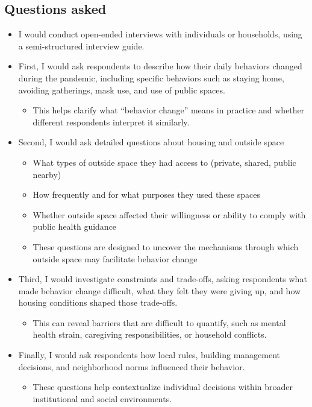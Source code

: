 \documentclass[
  letterpaper,
  DIV=11,
  numbers=noendperiod]{scrartcl}
\providecommand{\tightlist}{%
  \setlength{\itemsep}{0pt}\setlength{\parskip}{0pt}}
\begin{document}
\subsection{Questions asked}\label{questions-asked}

\begin{itemize}
\item
  I would conduct open-ended interviews with individuals or households,
  using a semi-structured interview guide.
\item
  First, I would ask respondents to describe how their daily behaviors
  changed during the pandemic, including specific behaviors such as
  staying home, avoiding gatherings, mask use, and use of public spaces.

  \begin{itemize}
  \tightlist
  \item
    This helps clarify what ``behavior change'' means in practice and
    whether different respondents interpret it similarly.
  \end{itemize}
\item
  Second, I would ask detailed questions about housing and outside space

  \begin{itemize}
  \item
    What types of outside space they had access to (private, shared,
    public nearby)
  \item
    How frequently and for what purposes they used these spaces
  \item
    Whether outside space affected their willingness or ability to
    comply with public health guidance
  \item
    These questions are designed to uncover the mechanisms through which
    outside space may facilitate behavior change
  \end{itemize}
\item
  Third, I would investigate constraints and trade-offs, asking
  respondents what made behavior change difficult, what they felt they
  were giving up, and how housing conditions shaped those trade-offs.

  \begin{itemize}
  \tightlist
  \item
    This can reveal barriers that are difficult to quantify, such as
    mental health strain, caregiving responsibilities, or household
    conflicts.
  \end{itemize}
\item
  Finally, I would ask respondents how local rules, building management
  decisions, and neighborhood norms influenced their behavior.

  \begin{itemize}
  \tightlist
  \item
    These questions help contextualize individual decisions within
    broader institutional and social environments.
  \end{itemize}
\end{itemize}
\end{document}
